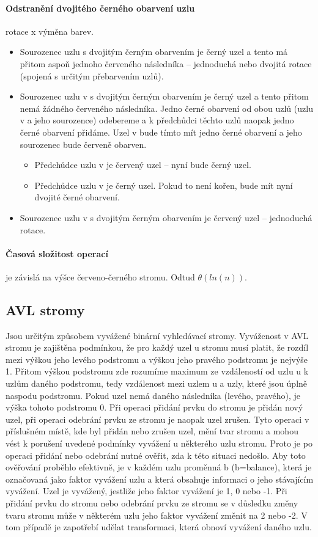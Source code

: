 \documentclass[10pt,a4paper]{article}
\begin{document}
\paragraph{Odstranění dvojitého černého obarvení uzlu}
rotace x výměna barev.
\begin{itemize}
	\item Sourozenec uzlu s dvojitým černým obarvením je černý uzel a tento má přitom aspoň jednoho červeného následníka – jednoduchá nebo dvojitá rotace (spojená s určitým přebarvením uzlů).
	\item Sourozenec uzlu v s dvojitým černým obarvením je černý uzel a tento přitom nemá žádného červeného následníka. Jedno černé obarvení od obou uzlů (uzlu v a jeho sourozence) odebereme a k předchůdci těchto uzlů naopak jedno černé obarvení přidáme. Uzel v bude tímto mít jedno černé obarvení a jeho sourozenec bude červeně obarven.
	\begin{itemize}
		\item Předchůdce uzlu v je červený uzel – nyní bude černý uzel.
		\item Předchůdce uzlu v je černý uzel. Pokud to není kořen, bude mít nyní dvojité černé obarvení.
	\end{itemize}
	\item Sourozenec uzlu v s dvojitým černým obarvením je červený uzel – jednoduchá rotace.
\end{itemize}
\paragraph{Časová složitost operací} je závislá na výšce červeno-černého stromu. Odtud $\theta(ln(n))$.




\subsection{AVL stromy}
Jsou určitým způsobem vyvážené binární vyhledávací stromy.
Vyváženost v AVL stromu je zajištěna podmínkou, že pro každý uzel u stromu musí platit, že rozdíl mezi výškou jeho levého podstromu a výškou jeho pravého podstromu je nejvýše 1. Přitom výškou podstromu zde rozumíme maximum ze vzdáleností od uzlu u k uzlům daného podstromu, tedy vzdálenost mezi uzlem u a uzly, které jsou úplně naspodu podstromu. Pokud uzel nemá daného následníka (levého, pravého), je výška tohoto podstromu 0.
Při operaci přidání prvku do stromu je přidán nový uzel, při operaci odebrání prvku ze stromu je naopak uzel zrušen. Tyto operaci v příslušném místě, kde byl přidán nebo zrušen uzel, mění tvar stromu a mohou vést k porušení uvedené podmínky vyvážení u některého uzlu stromu. Proto je po operaci přidání nebo odebrání nutné ověřit, zda k této situaci nedošlo. Aby toto ověřování proběhlo efektivně, je v každém uzlu proměnná b (b=balance), která je označovaná jako faktor vyvážení uzlu a která obsahuje informaci o jeho stávajícím vyvážení.
Uzel je vyvážený, jestliže jeho faktor vyvážení je 1, 0 nebo -1. Při přidání prvku do stromu nebo odebrání prvku ze stromu se v důsledku změny tvaru stromu může v některém uzlu jeho faktor vyvážení změnit na 2 nebo -2. V tom případě je zapotřebí udělat transformaci, která obnoví vyvážení daného uzlu.
\end{document}
